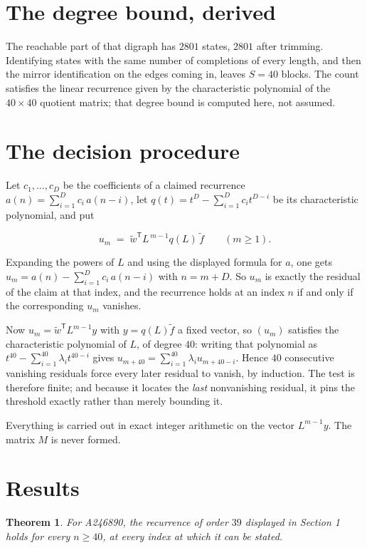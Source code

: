 \documentclass[11pt]{article}
\newtheorem{theorem}{Theorem}
\theoremstyle{definition}
\begin{document}
\section{The degree bound, derived}

The reachable part of that digraph has $2801$ states, $2801$ after trimming. Identifying states with the same number of completions of every length, and then the mirror identification on the edges coming in, leaves $S = 40$ blocks. The count satisfies the linear recurrence given by the characteristic polynomial of the $40\times40$ quotient matrix; that degree bound is computed here, not assumed.

\section{The decision procedure}

Let $c_1,\dots,c_D$ be the coefficients of a claimed recurrence $a(n) = \sum_{i=1}^{D} c_i\,a(n-i)$, let $q(t) = t^{D} - \sum_{i=1}^{D} c_i t^{D-i}$ be its characteristic polynomial, and put

\[u_m \;=\; \tilde w^{\mathsf T} L^{\,m-1} q(L)\,\tilde f \qquad (m \ge 1).\]

Expanding the powers of $L$ and using the displayed formula for $a$, one gets $u_m = a(n) - \sum_{i=1}^{D} c_i\,a(n-i)$ with $n = m + D$. So $u_m$ is exactly the residual of the claim at that index, and the recurrence holds at an index $n$ if and only if the corresponding $u_m$ vanishes.

Now $u_m = \tilde w^{\mathsf T} L^{m-1} y$ with $y = q(L)\tilde f$ a fixed vector, so $(u_m)$ satisfies the characteristic polynomial of $L$, of degree $40$: writing that polynomial as $t^{40} - \sum_{i=1}^{40} \lambda_i t^{40-i}$ gives $u_{m+40} = \sum_{i=1}^{40} \lambda_i u_{m+40-i}$. Hence $40$ consecutive vanishing residuals force every later residual to vanish, by induction. The test is therefore finite; and because it locates the {\itshape last} nonvanishing residual, it pins the threshold exactly rather than merely bounding it.

Everything is carried out in exact integer arithmetic on the vector $L^{m-1}y$. The matrix $M$ is never formed.

\section{Results}

\begin{theorem} For A246890, the recurrence of order $39$ displayed in Section 1 holds for every $n \ge 40$, at every index at which it can be stated.\end{theorem}
\end{document}
